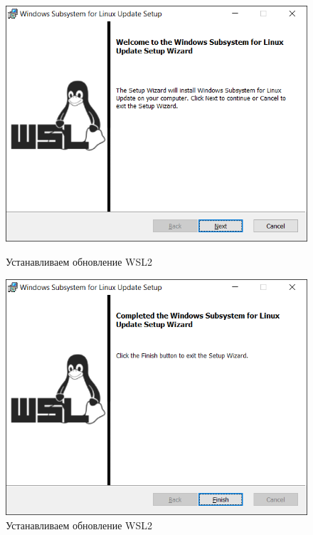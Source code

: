 \begin{figure}[!p]
    \centering
    \begin{minipage}{0.47\textwidth}
        \centering
        \includegraphics[width=\linewidth]
            {_assets/gpi_pz_docker_09.png}
        \caption{Устанавливаем обновление WSL2}
        \label{fig:gpi_pz_docker_09}
    \end{minipage}
    \begin{minipage}{0.47\textwidth}
        \centering
        \includegraphics[width=\linewidth]
            {_assets/gpi_pz_docker_10.png}
        \caption{Устанавливаем обновление WSL2}
        \label{fig:gpi_pz_docker_10}
    \end{minipage}
\end{figure}

